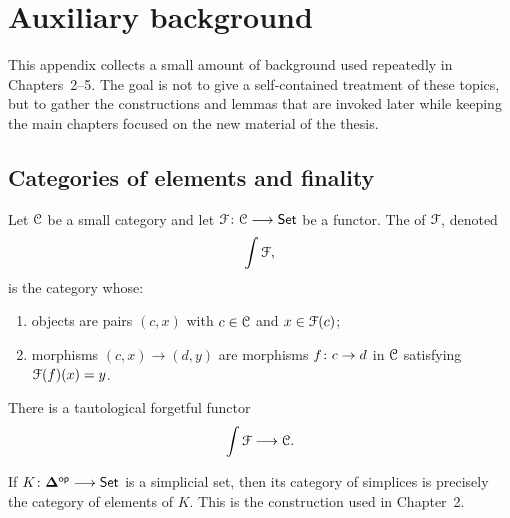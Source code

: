 \chapter{Auxiliary background}\label{sec:: ap: categorical_background}

This appendix collects a small amount of background used repeatedly in Chapters~2--5. The goal is not to give a self-contained treatment of these topics, but to gather the constructions and lemmas that are invoked later while keeping the main chapters focused on the new material of the thesis.

\section{Categories of elements and finality}

\begin{definition}\label{ap:: def: cat of els}
    Let $\mathcal C$ be a small category and let $\mathcal F \colon \mathcal C \longrightarrow \operatorname{{\mathsf{Set}}}$ be a functor. The  of $\mathcal F$, denoted
    \begin{equation}
        \int \mathcal F,
    \end{equation}
    is the category whose:
    \begin{enumerate}
        \item objects are pairs $(c,x)$ with $c\in \mathcal C$ and $x\in \mathcal F(c)$;
        \item morphisms $(c,x)\to (d,y)$ are morphisms $f\colon c\to d$ in $\mathcal C$ satisfying $\mathcal F(f)(x)=y$.
    \end{enumerate}
    There is a tautological forgetful functor
    \begin{equation}
        \int \mathcal F \longrightarrow \mathcal C.
    \end{equation}
\end{definition}

\begin{remark}
    If $K\colon \mathbf\Delta^{\mathsf{op}}\longrightarrow \operatorname{{\mathsf{Set}}}$ is a simplicial set, then its category of simplices is precisely the category of elements of $K$. This is the construction used in Chapter~2.
\end{remark}

